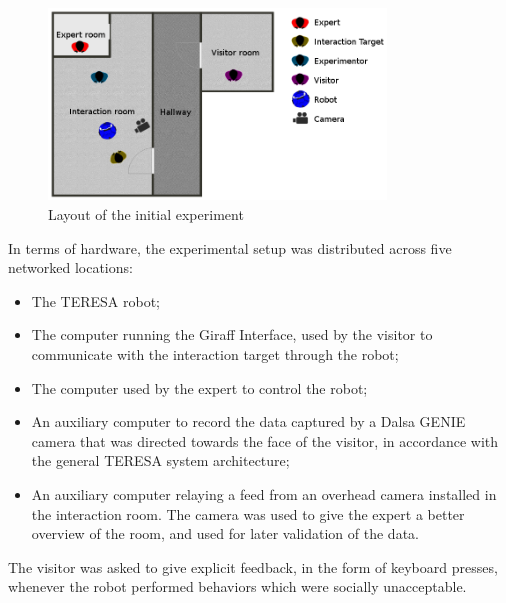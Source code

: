 \documentclass[a4paper,11pt]{report}
\begin{document}
\begin{figure}
    \centering
    \includegraphics[width=0.8\textwidth]{figures/experiment_setup_new.jpg}
    \caption{Layout of the initial experiment}
    	\label{fig:experiment_setup}
\end{figure} 

In terms of hardware, the experimental setup was distributed across five networked locations:
\begin{itemize}
\item The TERESA robot;
\item The computer running the Giraff Interface, used by the visitor to communicate with the interaction target through the robot;
\item The computer used by the expert to control the robot;
\item An auxiliary computer to record the data captured by a Dalsa GENIE camera that was directed towards the face of the visitor, in accordance with the general TERESA system architecture;
\item An auxiliary computer relaying a feed from an overhead camera installed in the interaction room. The camera was used to give the expert a better overview of the room, and used for later validation of the data.
\end{itemize}

The visitor was asked to give explicit feedback, in the form of keyboard presses, whenever the robot performed behaviors which were socially unacceptable.
\end{document}
